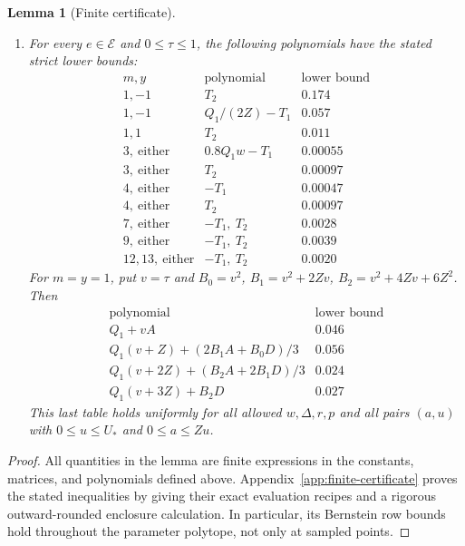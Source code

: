 \documentclass[11pt]{article}
\newtheorem{lemma}[theorem]{Lemma}
\theoremstyle{remark}\newtheorem{remark}[theorem]{Remark}
\begin{document}
\begin{lemma}[Finite certificate]
\begin{enumerate}
\item For every $e\in\mathcal E$ and $0\leq\tau\leq1$, the
following polynomials have the stated strict lower bounds:
\begin{equation}
\begin{array}{c|c|c}
 m,y&\text{polynomial}&\text{lower bound}\\\hline
 1,-1&T_2&0.174\\
 1,-1&Q_1/(2Z)-T_1&0.057\\
 1,1&T_2&0.011\\
 3,\ \text{either}&0.8Q_1w-T_1&0.00055\\
 3,\ \text{either}&T_2&0.00097\\
 4,\ \text{either}&-T_1&0.00047\\
 4,\ \text{either}&T_2&0.00097\\
 7,\ \text{either}&-T_1,\ T_2&0.0028\\
 9,\ \text{either}&-T_1,\ T_2&0.0039\\
 12,13,\ \text{either}&-T_1,\ T_2&0.0020
\end{array}
 \label{eq:finite-sign-tests}
\end{equation}
For $m=y=1$, put $v=\tau$ and
$B_0=v^2$, $B_1=v^2+2Zv$, $B_2=v^2+4Zv+6Z^2$. Then
\begin{equation}
\begin{array}{c|c}
 \text{polynomial}&\text{lower bound}\\\hline
 Q_1+vA&0.046\\
 Q_1(v+Z)+(2B_1A+B_0D)/3&0.056\\
 Q_1(v+2Z)+(B_2A+2B_1D)/3&0.024\\
 Q_1(v+3Z)+B_2D&0.027
\end{array}
 \label{eq:exceptional-tests}
\end{equation}
This last table holds uniformly for all allowed $w,\Delta,r,p$ and all
pairs $(a,u)$ with $0\le u\le U_*$ and $0\le a\le Zu$.
\end{enumerate}
\end{lemma}

\begin{proof}
All quantities in the lemma are finite expressions in the constants,
matrices, and polynomials defined above. Appendix~\ref{app:finite-certificate}
proves the stated inequalities by giving their exact evaluation recipes
and a rigorous outward-rounded enclosure calculation. In particular, its
Bernstein row bounds hold throughout the parameter polytope, not only at
sampled points.
\end{proof}
\end{document}
